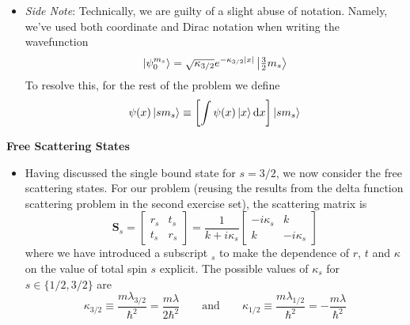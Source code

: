 \documentclass[11pt, a4paper]{article}
\newcommand{\diff}{\mathop{}\!\mathrm{d}} %
\newcommand{\eqtext}[1]{\qquad \text{#1} \qquad}
\newcommand{\mat}[1]{\mathbf{#1}} %
\begin{document}
\begin{itemize}
	\item \textit{Side Note}: Technically, we are guilty of a slight abuse of notation. Namely, we've used both coordinate and Dirac notation when writing the wavefunction
	\begin{equation*}
		\ket{\psi_{0}^{m_{s}}} = \sqrt{\kappa_{3/2}}e^{-\kappa_{3/2}\abs{x}} \ket{\tfrac{3}{2}m_{s}}
	\end{equation*}
	To resolve this, for the rest of the problem we define 
	\begin{equation*}
		\psi(x)\ket{sm_{s}} \equiv \left[\int \psi(x) \ket{x} \diff x \right] \ket{sm_{s}}
	\end{equation*}
\end{itemize}

\textbf{Free Scattering States}
\begin{itemize}	
	\item Having discussed the single bound state for $ s = 3/2 $, we now consider the free scattering states. For our problem (reusing the results from the delta function scattering problem in the second exercise set), the scattering matrix is
	\begin{equation*}
		\mat{S}_{s} = 
		\begin{bmatrix}
			r_{s} & t_{s}\\
			t_{s} & r_{s}
		\end{bmatrix}
		= 
		\frac{1}{k + i \kappa_{s}}
		\begin{bmatrix}
			-i\kappa_{s} & k\\
			k & -i \kappa_{s}
		\end{bmatrix}
	\end{equation*}
	where we have introduced a subscript $ _{s} $ to make the dependence of $ r $, $ t $ and $ \kappa $ on the value of total spin $ s $ explicit. The possible values of $ \kappa_{s} $ for $ s \in \{1/2, 3/2\} $ are
	\begin{equation*}
		\kappa_{3/2} \equiv \frac{m\lambda_{3/2}}{\hbar^{2}} = \frac{m\lambda}{2\hbar^{2}} \eqtext{and} \kappa_{1/2} \equiv \frac{m\lambda_{1/2}}{\hbar^{2}} = - \frac{m\lambda}{\hbar^{2}}
	\end{equation*}
	

\end{itemize}
\end{document}

